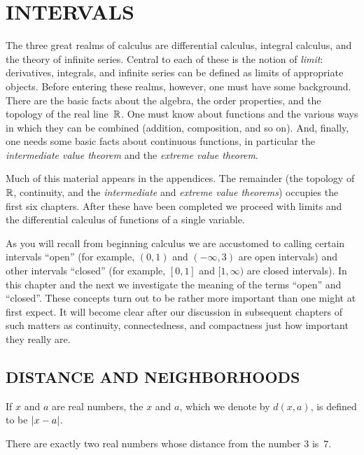 \chapter{INTERVALS}\label{intervals}

The three great realms of calculus are differential calculus, integral calculus, and the
theory of infinite series.  Central to each of these is the notion of \emph{limit}:
derivatives, integrals, and infinite series can be defined as limits of appropriate objects.
Before entering these realms, however, one must have some background.  There are the basic
facts about the algebra, the order properties, and the topology of the real line~$\mathbb{R}$.  One
must know about functions and the various ways in which they can be combined (addition,
composition, and so on). And, finally, one needs some basic facts about continuous functions,
in particular the \emph{intermediate value theorem} and the \emph{extreme value theorem}.

Much of this material appears in the appendices.  The remainder (the topology of $\mathbb{R}$,
continuity, and the \emph{intermediate} and \emph{extreme value theorems}) occupies the first
six chapters. After these have been completed we proceed with limits and the differential
calculus of functions of a single variable.

As you will recall from beginning calculus we are accustomed to calling certain intervals
``open'' (for example, $(0,1)$ and $(-\infty, 3)$ are open intervals) and other intervals
``closed'' (for example, $[0,1]$ and $[1,\infty)$ are closed intervals).  In this chapter and
the next we investigate the meaning of the terms ``open'' and ``closed''.  These concepts turn
out to be rather more important than one might at first expect.  It will become clear after
our discussion in subsequent chapters of such matters as continuity, connectedness, and
compactness just how important they really are.

\section{DISTANCE AND NEIGHBORHOODS}
\begin{defn} If $x$ and $a$ are real numbers, the
 $x$ and $a$, which we denote by $d(x,a)$, is defined to be $\lvert x-a\rvert$.
\end{defn}

\begin{exam} There are exactly two real numbers whose distance from the number $3$ is~$7$.
\end{exam}

